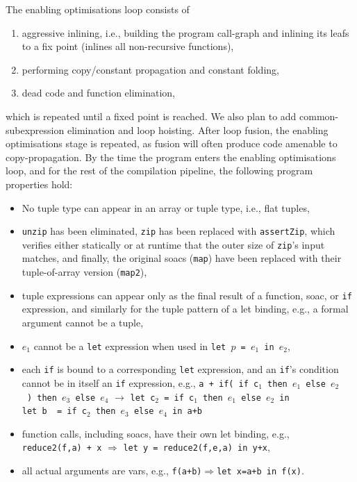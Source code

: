 \documentclass{sigplanconf}  %
\begin{document}
The enabling optimisations loop consists of
\begin{enumerate}
\item aggressive inlining, i.e., building the program call-graph
  and inlining its leafs to a fix point (inlines all non-recursive functions),
\item performing copy/constant propagation and constant folding,
\item dead code and function elimination,
\end{enumerate}
which is repeated until a fixed point is reached.  We also plan to add
common-subexpression elimination and loop hoisting.  After loop
fusion, the enabling optimisations stage is repeated, as fusion will
often produce code amenable to copy-propagation.  By the time the
program enters the enabling optimisations loop, and for the rest of
the compilation pipeline, the following program properties hold:

\begin{itemize}
\item No tuple type can appear in an array or tuple type, i.e., flat tuples,
\item {\tt unzip} has been eliminated, {\tt zip} has been
  replaced with {\tt assertZip}, which verifies either
  statically or at runtime that the outer size of {\tt zip}'s
  input matches, and finally, the original {\sc soac}s ({\tt map})
  have been replaced with their tuple-of-array version ({\tt map2}),
\item tuple expressions can appear only as the final result of
  a function, {\sc soac}, or {\tt if} expression, and similarly
  for the tuple pattern of a let binding, e.g., a formal argument
  cannot be a tuple,
\item %
  $e_1$ cannot be a {\tt let} expression when used 
  in {\tt let~$p$~=~$e_1$~in~$e_2$},
\item each {\tt if} is bound to a corresponding {\tt let} expression, and an
  {\tt if}'s condition cannot be in itself an {\tt if} expression, e.g.,
  {\tt a~+~if(~if~c$_1$~then~$e_1$~else~$e_2$~)~then~$e_3$~else~$e_4$} $\rightarrow$
  {\tt let~c$_2$~=~if~c$_1$~then~$e_1$~else~$e_2$~in}\\
  {\tt let~b~~=~if~c$_2$~then~$e_3$~else~$e_4$~in~a+b}
\item function calls, including {\sc soac}s, have their own let binding,
  e.g., {\tt reduce2(f,a)~+~x} $\Rightarrow$
  {\tt let~y~=~reduce2(f,e,a)~in~y+x},
\item all actual arguments are vars,
  e.g., {\tt f(a+b)}$\Rightarrow${\tt let~x=a+b~in~f(x)}.
\end{itemize}
\end{document}
